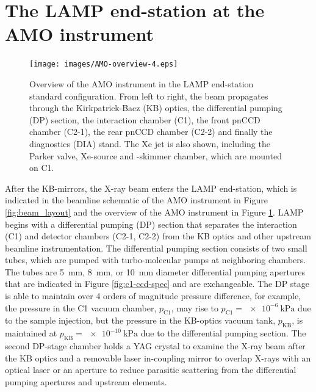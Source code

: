 \section{The LAMP end-station at the AMO instrument}\label{sec:LAMP-endstation}
\begin{figure}
	\centering
		\texttt{[image: images/AMO-overview-4.eps]}
	\caption[Overview of the AMO instrument in the LAMP end-station configuration.]{Overview of the AMO instrument in the LAMP end-station standard configuration. From left to right, the beam propagates through the Kirkpatrick-Baez (KB) optics, the differential pumping (DP) section, the interaction chamber (C1), the front pnCCD chamber (C2-1), the rear pnCCD chamber (C2-2) and finally the diagnostics (DIA) stand. The Xe jet is also shown, including the Parker valve, Xe-source and -skimmer chamber, which are mounted on C1.
}
	\label{fig:LAMP-overview}
\end{figure}
%
After the KB-mirrors, the X-ray beam enters the LAMP end-station, which is indicated in the beamline schematic of the AMO instrument in Figure \ref{fig:beam_layout} and the overview of the AMO instrument in Figure \ref{fig:LAMP-overview}. LAMP begins with a differential pumping (DP) section that separates the interaction (C1) and detector chambers (C2-1, C2-2) from the KB optics and other upstream beamline instrumentation. The differential pumping section consists of two small tubes, which are pumped with turbo-molecular pumps at neighboring chambers. The tubes are \SI{5}{\milli\meter}, \SI{8}{\milli\meter}, or \SI{10}{\milli\meter} diameter differential pumping apertures that are indicated in Figure \ref{fig:c1-ccd-spec} and are exchangeable. The DP stage is able to maintain over 4 orders of magnitude pressure difference, for example, the pressure in the C1 vacuum chamber, $p_{\text{C1}}$, may rise to $p_{\text{C1}}=\SI{e-6}{\kilo\pascal}$ due to the sample injection, but the pressure in the KB-optics vacuum tank, $p_{\text{KB}}$, is maintained at $p_{\text{KB}}=\SI{e-10}{\kilo\pascal}$ due to the differential pumping section. The second DP-stage chamber holds a YAG crystal to examine the X-ray beam after the KB optics and a removable laser in-coupling mirror to overlap X-rays with an optical laser or an aperture to reduce parasitic scattering from the differential pumping apertures and upstream elements.\\[1\baselineskip]
